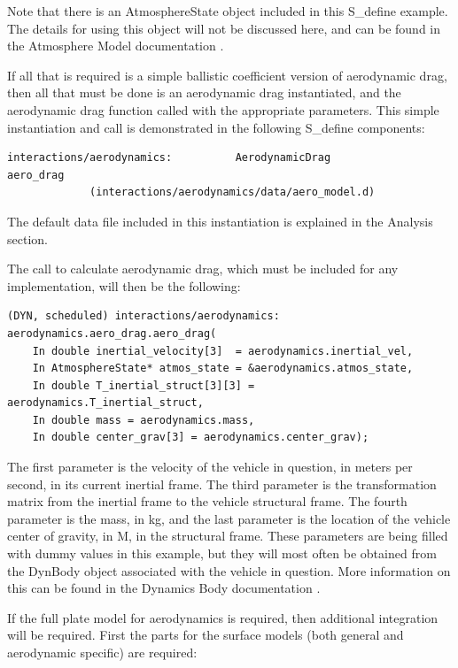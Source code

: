 Note that there is an AtmosphereState object included in this S\_define
example. The details for using this object will not be discussed here,
and can be found in the Atmosphere Model documentation
\cite{dynenv:ATMOSPHERE}.

If all that is required is a simple ballistic coefficient version
of aerodynamic drag, then all that must be done is an aerodynamic
drag instantiated, and the aerodynamic drag function called with
the appropriate parameters. This simple instantiation and call is
demonstrated in the following S\_define components:

\begin{verbatim}
interactions/aerodynamics:          AerodynamicDrag           aero_drag
             (interactions/aerodynamics/data/aero_model.d)
\end{verbatim}

The default data file included in this instantiation is explained in the
Analysis section.

The call to calculate aerodynamic drag, which must be included
for any implementation, will then be the following:

\begin{verbatim}
(DYN, scheduled) interactions/aerodynamics: aerodynamics.aero_drag.aero_drag(
    In double inertial_velocity[3]  = aerodynamics.inertial_vel,
    In AtmosphereState* atmos_state = &aerodynamics.atmos_state,
    In double T_inertial_struct[3][3] = aerodynamics.T_inertial_struct,
    In double mass = aerodynamics.mass,
    In double center_grav[3] = aerodynamics.center_grav);
\end{verbatim}

The first parameter is the velocity of the vehicle in question, in
meters per second,
in its current inertial frame. The third parameter is the transformation
matrix from the inertial frame to the vehicle structural frame.
The fourth parameter is the mass, in kg, and the last parameter is
the location of the vehicle center of gravity, in M, in the
structural frame. These parameters are being filled with dummy values
in this example, but they will most often be obtained from the
DynBody object associated with the vehicle in question. More information
on this can be found in the Dynamics Body documentation
\cite{dynenv:DYNBODY}.

If the full plate model for aerodynamics is required, then additional
integration will be required. First the parts for the surface models
(both general and aerodynamic specific) are required:


